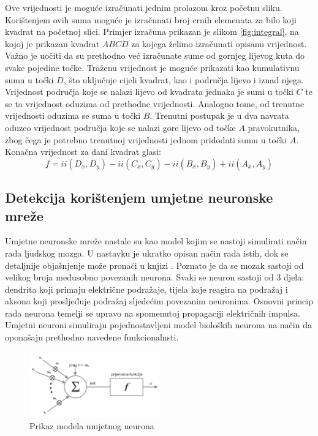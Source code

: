 \documentclass[times, utf8, zavrsni, numeric]{fer}
\begin{document}
Ove vrijednosti je moguće izračunati jednim prolazom kroz početnu sliku. 
Korištenjem ovih suma moguće je izračunati broj crnih elemenata za bilo koji kvadrat na početnoj slici.
Primjer izračuna prikazan je slikom \ref{fig:integral}, na kojoj je prikazan kvadrat $ABCD$ za kojega želimo izračunati opisanu vrijednost. 
Važno je uočiti da su prethodno već izračunate sume od gornjeg lijevog kuta do svake pojedine točke.
Traženu vrijednost je moguće prikazati kao kumulativnu sumu u točki $D$, što uključuje cijeli kvadrat, kao i područja lijevo i iznad njega.
Vrijednost područja koje se nalazi lijevo od kvadrata jednaka je sumi u točki $C$ te se ta vrijednost oduzima od prethodne vrijednosti.
Analogno tome, od trenutne vrijednosti oduzima se suma u točki $B$.
Trenutni postupak je u dva navrata oduzeo vrijednost područja koje se nalazi gore lijevo od točke $A$ pravokutnika, zbog čega je potrebno trenutnoj vrijednosti jednom pridodati sumu u točki $A$.
Konačna vrijednost za dani kvadrat glasi:
\[
    f = ii(D_x, D_y) - ii(C_x, C_y) - ii(B_x, B_y) + ii(A_x, A_y)
\]

\subsection{Detekcija korištenjem umjetne neuronske mreže}
Umjetne neuronske mreže nastale su kao model kojim se nastoji simulirati način rada ljudskog mozga.
U nastavku je ukratko opisan način rada istih, dok se detaljnije objašnjenje može pronaći u knjizi \cite{umjetnaInteligencija}.
Poznato je da se mozak sastoji od velikog broja međusobno povezanih neurona.
Svaki se neuron sastoji od $3$ djela: dendrita koji primaju električne podražaje, tijela koje reagira na podražaj i aksona koji prosljeđuje podražaj sljedećim povezanim neuronima.
Osnovni princip rada neurona temelji se upravo na spomenutoj propagaciji električnih impulsa. 
Umjetni neuroni simuliraju pojednostavljeni model bioloških neurona na način da oponašaju prethodno navedene funkcionalnsti.

\begin{figure}[ht!]
    \centering
    \includegraphics[width=0.5\textwidth]{Images/Neuron.png}
    \captionsetup{justification=centering}
    \caption{Prikaz modela umjetnog neurona}
    \label{fig:neuron}
\end{figure}
\end{document}
